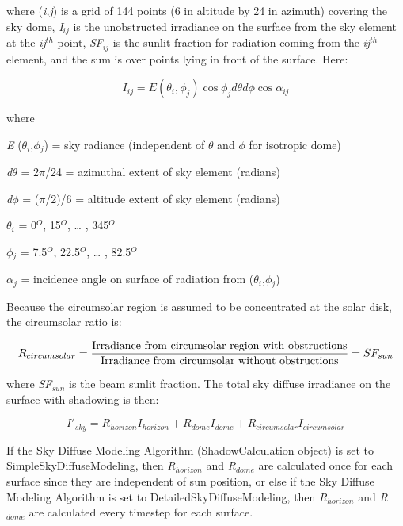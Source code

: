 where (\emph{i,j}) is a grid of 144 points (6 in altitude by 24 in azimuth) covering the sky dome, \emph{I\(_{ij}\)} is the unobstructed irradiance on the surface from the sky element at the \emph{ij}\(^{th}\) point, \emph{SF\(_{ij}\)} is the sunlit fraction for radiation coming from the \emph{ij}\(^{th}\) element, and the sum is over points lying in front of the surface. Here:

\begin{equation}
{I_{ij}} = E({\theta_i},{\phi_j})\cos {\phi_j}d\theta d\phi \cos {\alpha_{ij}}
\end{equation}

where

\emph{E} (\emph{$\theta$\(_{i}\)},\emph{$\phi$\(_{j}\)}) = sky radiance (independent of $\theta$ and $\phi$ for isotropic dome)

\emph{d$\theta$} = 2$\pi$/24 = azimuthal extent of sky element (radians)

\emph{d$\phi$} = ($\pi$/2)/6 = altitude extent of sky element (radians)

\emph{$\theta$\(_{i}\)} = 0\(^{O}\), 15\(^{O}\), \ldots{} , 345\(^{O}\)

\emph{$\phi$\(_{j}\)} = 7.5\(^{O}\), 22.5\(^{O}\), \ldots{} , 82.5\(^{O}\)

$\alpha$\(_{j}\) = incidence angle on surface of radiation from (\emph{$\theta$\(_{i}\)},\emph{$\phi$\(_{j}\)})

Because the circumsolar region is assumed to be concentrated at the solar disk, the circumsolar ratio is:

\begin{equation}
{R_{circumsolar}} = \frac{{{\rm{Irradiance~from~circumsolar~region~with~obstructions}}}}{{{\rm{Irradiance~from~circumsolar~without~obstructions}}}} = S{F_{sun}}
\end{equation}

where \emph{SF\(_{sun}\)} is the beam sunlit fraction. The total sky diffuse irradiance on the surface with shadowing is then:

\begin{equation}
{I'_{sky}} = {R_{horizon}}{I_{horizon}} + {R_{dome}}{I_{dome}} + {R_{circumsolar}}{I_{circumsolar}}
\end{equation}

If the Sky Diffuse Modeling Algorithm (ShadowCalculation object) is set to SimpleSkyDiffuseModeling, then \emph{R\(_{horizon}\)} and \emph{R\(_{dome}\)} are calculated once for each surface since they are independent of sun position, or else if the Sky Diffuse Modeling Algorithm is set to DetailedSkyDiffuseModeling, then \emph{R\(_{horizon}\)} and \emph{R\(_{dome}\)} are calculated every timestep for each surface.

